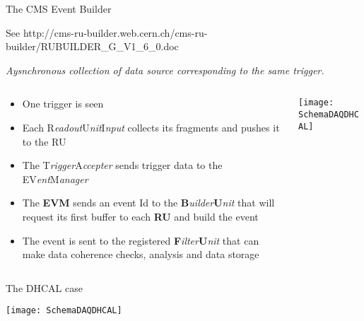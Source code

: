 \documentclass[10pt]{beamer}
\begin{document}
\begin{frame}[shrink=5]{The CMS Event Builder}

See {\tiny http://cms-ru-builder.web.cern.ch/cms-ru-builder/RUBUILDER\_G\_V1\_6\_0.doc}



{\sl Aysnchronous collection of data source corresponding to the same trigger.}

\bigskip
\begin{columns}
   \begin{column}{0.5\textwidth}
    \begin{itemize}
      \item {\small One trigger is seen}
      \item {\small Each R{\sl eadout}U{\sl nit}I{\sl nput} collects its fragments and pushes it to the RU}
      \item {\small The T{\sl rigger}A{\sl ccepter} sends trigger data to the EV{\sl ent}M{\sl anager} }
      \item {\small The {\bf EVM} sends an event Id to the {\bf B}{\sl uilder}{\bf U}{\sl nit} that will request its first buffer to each {\bf RU} and build the event}
      \item {\small The event is sent to the registered {\bf F}{\sl ilter}{\bf U}{\sl nit} that can make data coherence checks, analysis and data storage}
    \end{itemize}
  \end{column}

  \begin{column}{0.65\textwidth}
    \centerline{\texttt{[image: SchemaDAQDHCAL]}}
  \end{column}
\end{columns}
\end{frame}

\begin{frame}{The DHCAL case}
 \centerline{\texttt{[image: SchemaDAQDHCAL]}}
\end{frame}
\end{document}
